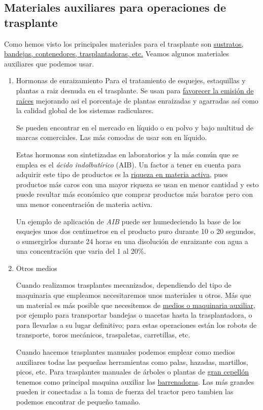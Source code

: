 \documentclass[a4paper,12pt,oneside]{article}
\begin{document}
\subsection{Materiales auxiliares para operaciones de trasplante}
\label{sec:org7d24ed4}

Como  hemos visto los principales materiales para el trasplante son
\uline{sustratos, bandejas, contenedores, trasplantadoras, etc.} Veamos algunos
materiales auxiliares que podemos usar.

\begin{enumerate}
\item Hormonas de enraizamiento
\label{sec:orgdff8565}
Para el tratamiento de esquejes, estaquillas y plantas a raiz desnuda en el
trasplante. Se usan para \uline{favorecer la emisión de raíces} mejorando asi el
porcentaje de plantas enraizadas y agarradas así como la calidad global de los
sistemas radiculares.

Se pueden encontrar en el mercado en líquido o en polvo y bajo multitud de
marcas comerciales. Las más comodas de usar son en líquido.

Estas hormonas son sintetizadas en laboratorios y la más común que se emplea es
el \emph{ácido indolbutírico} (AIB). Un factor a tener en cuenta para adquirir este
tipo de productos es la \uline{riqueza en materia activa}, pues productos más caros
con una mayor riqueza se usan en menor cantidad y esto puede resultar más
económico que comprar productos más baratos pero con una menor concentración de
materia activa.

Un ejemplo de aplicación de \emph{AIB} puede ser humedeciendo la base de los
esquejes unos dos centimetros en el producto puro durante 10 o 20 segundos, o
sumergirlos durante 24 horas en una disolución de enraizante con agua a una
concentración que varia del 1 al 20\%.

\item Otros medios
\label{sec:orgd774fa0}

Cuando realizamos trasplantes mecanizados, dependiendo del tipo de maquinaria
que empleamos necesitaremos unos materiales u otros. Más que un material es más
posible que necesitemos de \uline{medios o maquinaria auxiliar}, por ejemplo para
transportar bandejas o macetas hasta la trasplantadora, o para llevarlas a su
lugar definitivo; para estas operaciones están los robots de transporte, toros
mecánicos, traspaletas, carretillas, etc.

Cuando hacemos trasplantes manuales podemos emplear como medios auxiliares todas
las pequeñas herramientas como palas, hazadas, martillos, picos, etc. Para
trasplantes manuales de árboles o plantas de \uline{gran cepellón} tenemos como
principal  maquina auxiliar las \uline{barrenadoras}. Las más grandes pueden ir
conectadas a la toma de fuerza del tractor pero tambien las podemos encontrar de
pequeño tamaño.


\end{enumerate}
\end{document}
